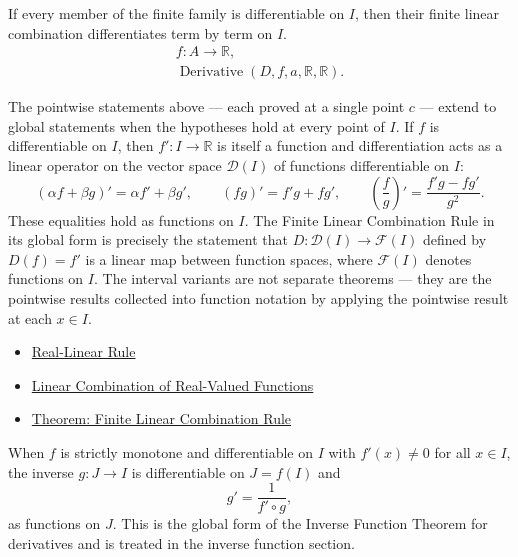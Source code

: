 \begin{remark*}
If every member of the finite family is differentiable on $I$, then their
finite linear combination differentiates term by term on $I$.
\[
\begin{aligned}
  f\colon A\to\mathbb{R},\\
  \operatorname{Derivative}(D,f,a,\mathbb{R},\mathbb{R}).
\end{aligned}
\]
\end{remark*}

\begin{remark*}[Interpretation]
The pointwise statements above --- each proved at a single point $c$ --- extend to global statements when the hypotheses hold at every point of $I$. If $f$ is differentiable on $I$, then $f' : I \to \mathbb{R}$ is itself a function and differentiation acts as a linear operator on the vector space $\mathcal{D}(I)$ of functions differentiable on $I$:
\[
  (\alpha f + \beta g)' = \alpha f' + \beta g',\qquad
  (fg)' = f'g + fg',\qquad
  \left(\frac{f}{g}\right)' = \frac{f'g - fg'}{g^2}.
\]
These equalities hold as functions on $I$. The Finite Linear Combination Rule in its global form is precisely the statement that $D : \mathcal{D}(I) \to \mathcal{F}(I)$ defined by $D(f) = f'$ is a linear map between function spaces, where $\mathcal{F}(I)$ denotes functions on $I$. The interval variants are not separate theorems --- they are the pointwise results collected into function notation by applying the pointwise result at each $x \in I$.
\end{remark*}

\begin{dependencies}
\begin{itemize}
  \item \hyperref[def:real-linear-rule]{Real-Linear Rule}
  \item \hyperref[def:linear-combination-of-real-valued-functions]{Linear Combination of Real-Valued Functions}
  \item \hyperref[thm:finite-linear-combination-rule]{Theorem: Finite Linear Combination Rule}
\end{itemize}
\end{dependencies}


\begin{exposition}
When $f$ is strictly monotone and differentiable on $I$ with $f'(x) \neq 0$ for all $x \in I$, the inverse $g : J \to I$ is differentiable on $J = f(I)$ and
\[
g' = \frac{1}{f' \circ g},
\]
as functions on $J$. This is the global form of the Inverse Function Theorem for derivatives and is treated in the inverse function section.
\end{exposition}
